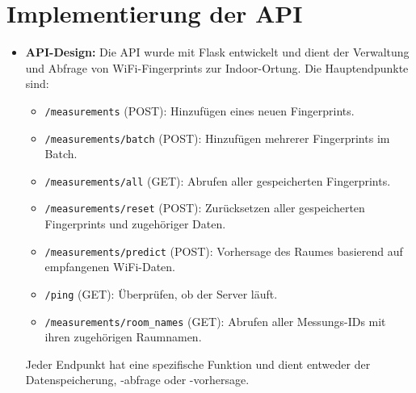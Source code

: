 \section{Implementierung der API}
\begin{itemize}
    \item \textbf{API-Design:} Die API wurde mit Flask entwickelt und dient der Verwaltung und Abfrage von WiFi-Fingerprints zur Indoor-Ortung. Die Hauptendpunkte sind:
        \begin{itemize}
            \item \texttt{/measurements} (POST): Hinzufügen eines neuen Fingerprints.
            \item \texttt{/measurements/batch} (POST): Hinzufügen mehrerer Fingerprints im Batch.
            \item \texttt{/measurements/all} (GET): Abrufen aller gespeicherten Fingerprints.
            \item \texttt{/measurements/reset} (POST): Zurücksetzen aller gespeicherten Fingerprints und zugehöriger Daten.
            \item \texttt{/measurements/predict} (POST): Vorhersage des Raumes basierend auf empfangenen WiFi-Daten.
            \item \texttt{/ping} (GET): Überprüfen, ob der Server läuft.
            \item \texttt{/measurements/room\_names} (GET): Abrufen aller Messungs-IDs mit ihren zugehörigen Raumnamen.
        \end{itemize}
        Jeder Endpunkt hat eine spezifische Funktion und dient entweder der Datenspeicherung, -abfrage oder -vorhersage.


\end{itemize}
